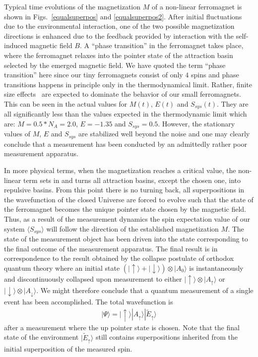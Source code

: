 \documentclass[showpacs,preprintnumbers,amsmath,amssymb,12pt]{revtex4-2}
\begin{document}
Typical time evolutions of the magnetization $M$ of a non-linear
ferromagnet is shown in Figs.~\ref{equalsuperpos} and
\ref{equalsuperpos2}. After initial fluctuations due to the
environmental interaction, one of the two possible magnetization
directions is enhanced due to the feedback provided by interaction
with the self-induced magnetic field $B$. A ``phase transition'' in
the ferromagnet takes place, where the ferromagnet relaxes into the
pointer state of the attraction basin selected by the emerged magnetic
field. We have quoted the term ``phase transition'' here since our
tiny ferromagnets consist of only $4$ spins and phase transitions
happens in principle only in the thermodynamical limit. Rather, finite
size effects~\cite{Privman} are expected to dominate the behavior of
our small ferromagnets. This can be seen in the actual values for
$M(t)$, $E(t)$ and $S_{sys}(t)$. They are all significantly less than
the values expected in the thermodynamic limit which are:
$M=0.5*N_A=2.0$, $E=-1.35$ and $S_{sys}=0.5$. However, the stationary
values of $M$, $E$ and $S_{sys}$ are stabilized well beyond the noise
and one may clearly conclude that a measurement has been conducted by
an admittedly rather poor measurement apparatus.

In more physical terms, when the magnetization reaches a critical
value, the non-linear term sets in and turns all attraction basins,
except the chosen one, into repulsive basins. From this point there is
no turning back, all superpositions in the wavefunction of the closed
Universe are forced to evolve such that the state of the ferromagnet
becomes the unique pointer state chosen by the magnetic field. Thus,
as a result of the measurement dynamics the spin expectation value of
our system $\langle S_{sys}\rangle$ will follow the direction of the
established magnetization $M$. The state of the measurement object has
been driven into the state corresponding to the final outcome of the
measurement apparatus. The final result is in correspondence to the
result obtained by the collapse postulate of orthodox quantum theory
where an initial state $(|\uparrow\rangle+|\downarrow\rangle)\otimes
|A_0\rangle$ is instantaneously and discontinuously collapsed upon
measurement to either $|\uparrow\rangle\otimes |A_{\uparrow}\rangle$
or $|\downarrow\rangle\otimes |A_{\downarrow}\rangle$.  We might
therefore conclude that a quantum measurement of a single event has
been accomplished. The total wavefunction is
\begin{eqnarray} |\Psi \rangle = |\uparrow \rangle |A_\uparrow \rangle
  |\tilde{E}_\uparrow \rangle
\end{eqnarray}
after a measurement where the up pointer state is chosen. Note that
the final state of the environment $|\tilde{E}_\uparrow \rangle$ still
contains superpositions inherited from the initial superposition of
the measured spin.
\end{document}
